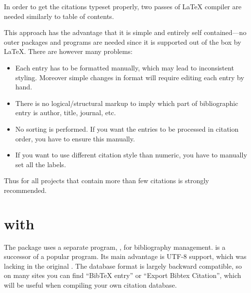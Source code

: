 In order to get the citations typeset properly, two passes of \LaTeX{} compiler
are needed similarly to table of contents.

This approach has the advantage that it is simple and entirely self
contained---no outer packages and programs are needed since it is supported out
of the box by \LaTeX{}. There are however many problems:
\begin{itemize}
  \item Each entry has to be formatted manually, which may lead to inconsistent
        styling. Moreover simple changes in format will require editing each entry by
        hand.
  \item There is no logical/structural markup to imply which part of
        bibliographic entry is author, title, journal, etc.
  \item No sorting is performed. If you want the entries to be processed in
        citation order, you have to ensure this manually.
  \item If you want to use different citation style than numeric, you have to
        manually set all the labels.
\end{itemize}
Thus for all projects that contain more than few citations  is
strongly recommended.


\section{ with }

The  package uses a separate program, , for
bibliography management.  is a successor of a popular
 program. Its main advantage is UTF-8 support, which was lacking
in the original . The database format is largely backward
compatible, so on many sites you can find ``BibTeX entry'' or ``Export Bibtex
Citation'', which will be useful when compiling your own citation database.

